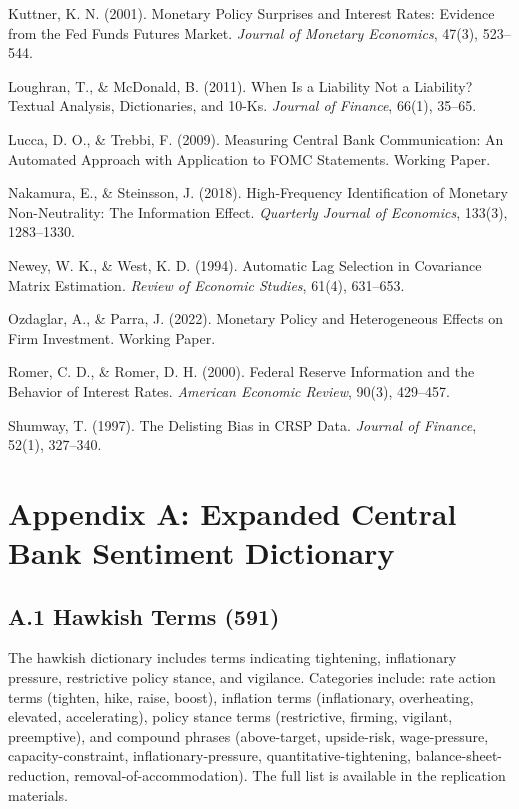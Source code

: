 \documentclass[12pt]{article}
\begin{document}
Kuttner, K. N. (2001). Monetary Policy Surprises and Interest Rates: Evidence from the Fed Funds Futures Market. \textit{Journal of Monetary Economics}, 47(3), 523--544.

Loughran, T., \& McDonald, B. (2011). When Is a Liability Not a Liability? Textual Analysis, Dictionaries, and 10-Ks. \textit{Journal of Finance}, 66(1), 35--65.

Lucca, D. O., \& Trebbi, F. (2009). Measuring Central Bank Communication: An Automated Approach with Application to FOMC Statements. Working Paper.

Nakamura, E., \& Steinsson, J. (2018). High-Frequency Identification of Monetary Non-Neutrality: The Information Effect. \textit{Quarterly Journal of Economics}, 133(3), 1283--1330.

Newey, W. K., \& West, K. D. (1994). Automatic Lag Selection in Covariance Matrix Estimation. \textit{Review of Economic Studies}, 61(4), 631--653.

Ozdaglar, A., \& Parra, J. (2022). Monetary Policy and Heterogeneous Effects on Firm Investment. Working Paper.

Romer, C. D., \& Romer, D. H. (2000). Federal Reserve Information and the Behavior of Interest Rates. \textit{American Economic Review}, 90(3), 429--457.

Shumway, T. (1997). The Delisting Bias in CRSP Data. \textit{Journal of Finance}, 52(1), 327--340.


\section{Appendix A: Expanded Central Bank Sentiment Dictionary}

\subsection{A.1 Hawkish Terms (591)}

The hawkish dictionary includes terms indicating tightening, inflationary pressure, restrictive policy stance, and vigilance. Categories include: rate action terms (tighten, hike, raise, boost), inflation terms (inflationary, overheating, elevated, accelerating), policy stance terms (restrictive, firming, vigilant, preemptive), and compound phrases (above-target, upside-risk, wage-pressure, capacity-constraint, inflationary-pressure, quantitative-tightening, balance-sheet-reduction, removal-of-accommodation). The full list is available in the replication materials.
\end{document}
